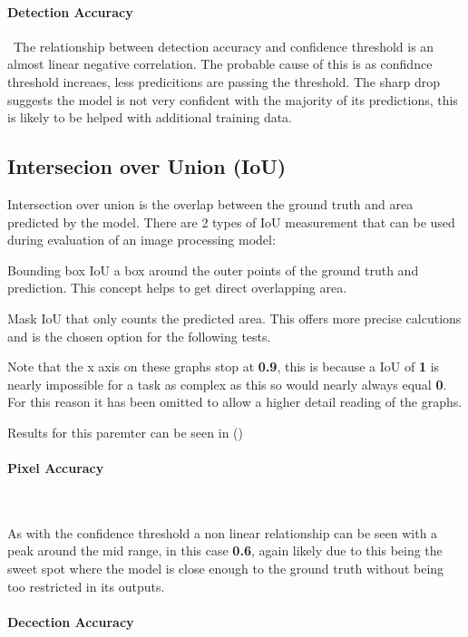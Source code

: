 \documentclass[final]{cmpreport_02}
\begin{document}
\paragraph{Detection Accuracy} \
The relationship between detection accuracy and confidence threshold is an almost linear negative correlation.
The probable cause of this is as confidnce threshold increaes, less predicitions are passing the threshold.
The sharp drop suggests the model is not very confident with the majority of its predictions, this is likely to be helped with additional training data.



\subsection{Intersecion over Union (IoU)}
Intersection over union is the overlap between the ground truth and area predicted by the model.
There are 2 types of IoU measurement that can be used during evaluation of an image processing model:

Bounding box IoU a box around the outer points of the ground truth and prediction.
This concept helps to get direct overlapping area.

Mask IoU that only counts the predicted area. This offers more precise calcutions and is the chosen option for the following tests.

Note that the x axis on these graphs stop at \textbf{0.9}, this is because a IoU of \textbf{1} is nearly impossible for a task as complex as this so would nearly always equal \textbf{0}. For this reason it has been omitted to allow a higher detail reading of the graphs.

Results for this paremter can be seen in ()

\paragraph{Pixel Accuracy} \

As with the confidence threshold a non linear relationship can be seen with a peak around the mid range, in this case \textbf{0.6}, again likely due to this being the sweet spot where the model is close enough to the ground truth without being too restricted in its outputs.

\paragraph{Decection Accuracy} \
\end{document}
